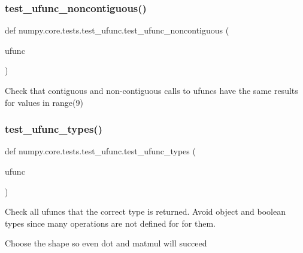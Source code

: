\subsubsection{\texorpdfstring{test\+\_\+ufunc\+\_\+noncontiguous()}{test\_ufunc\_noncontiguous()}}
{\footnotesize\ttfamily def numpy.\+core.\+tests.\+test\+\_\+ufunc.\+test\+\_\+ufunc\+\_\+noncontiguous (\begin{DoxyParamCaption}\item[{}]{ufunc }\end{DoxyParamCaption})}

\begin{DoxyVerb}Check that contiguous and non-contiguous calls to ufuncs
have the same results for values in range(9)
\end{DoxyVerb}
 \mbox{\label{namespacenumpy_1_1core_1_1tests_1_1test__ufunc_aee8de8e210cba17fa83502ee13078eac}} 
\subsubsection{\texorpdfstring{test\+\_\+ufunc\+\_\+types()}{test\_ufunc\_types()}}
{\footnotesize\ttfamily def numpy.\+core.\+tests.\+test\+\_\+ufunc.\+test\+\_\+ufunc\+\_\+types (\begin{DoxyParamCaption}\item[{}]{ufunc }\end{DoxyParamCaption})}

\begin{DoxyVerb}Check all ufuncs that the correct type is returned. Avoid
object and boolean types since many operations are not defined for
for them.

Choose the shape so even dot and matmul will succeed
\end{DoxyVerb}
 \mbox{\label{namespacenumpy_1_1core_1_1tests_1_1test__ufunc_a4f31933317456619f6c7ebf6c2ea94b1}} 
